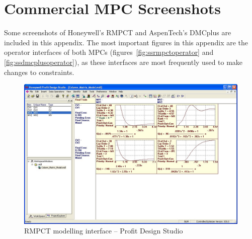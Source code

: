 \chapter{Commercial MPC Screenshots}\label{app:screenshots}
\begin{overview}
  Some screenshots of Honeywell's RMPCT and AspenTech's DMCplus are included in this appendix.
  The most important figures in this appendix are the operator interfaces of both MPCs (figures~\ref{fig:ssrmpctoperator} and \ref{fig:ssdmcplusoperator}), as these interfaces are most frequently used to make changes to constraints.
\end{overview}

\newpage

\begin{landscape}

  \begin{figure}[htbp]
    \centering
      \includegraphics[width=25cm]{graph/ss_rmpctdesignstudio.jpg}
    \caption[RMPCT Profit Design Studio interface]{RMPCT modelling interface -- Profit Design Studio}
    \label{fig:ssrmpctmodel}
  \end{figure}


\end{landscape}
